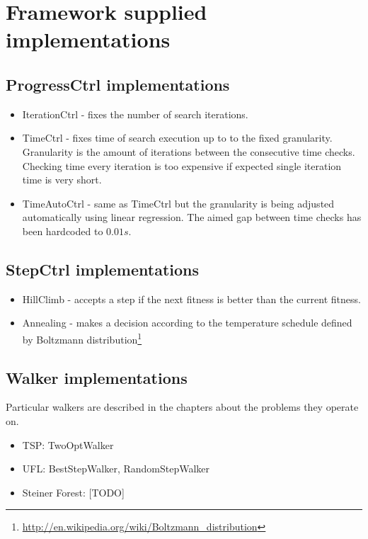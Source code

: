 \section{Framework supplied implementations}

\subsection{ProgressCtrl implementations}
\begin{itemize}
\item IterationCtrl - fixes the number of search iterations.
\item TimeCtrl - fixes time of search execution up to to the fixed granularity.
	Granularity is the amount of iterations between the consecutive time checks.
	Checking time every iteration is too expensive if expected single iteration time
	is very short.
\item TimeAutoCtrl - same as TimeCtrl but the granularity is being adjusted
	automatically using linear regression. The aimed gap between time checks has
	been hardcoded to $0.01s$.
\end{itemize}

\subsection{StepCtrl implementations}
\begin{itemize}
\item HillClimb - accepts a step if the next fitness is better than the current fitness.
\item Annealing - makes a decision according to the temperature schedule defined by
	Boltzmann distribution\footnote{\url{http://en.wikipedia.org/wiki/Boltzmann_distribution}}
\end{itemize}

\subsection{Walker implementations}
Particular walkers are described in the chapters about the problems they operate on.
\begin{itemize}
\item TSP: TwoOptWalker
\item UFL: BestStepWalker, RandomStepWalker
\item Steiner Forest: [TODO]
\end{itemize}

